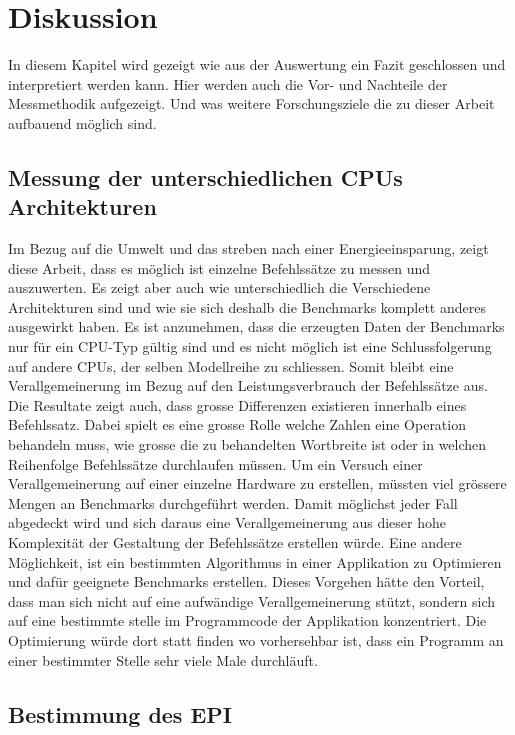 \chapter{Diskussion}

In diesem Kapitel wird gezeigt wie aus der Auswertung ein Fazit geschlossen und interpretiert werden kann. Hier werden auch die Vor- und Nachteile der Messmethodik aufgezeigt. Und was weitere Forschungsziele die zu dieser Arbeit aufbauend möglich sind.

\section{Messung der unterschiedlichen CPUs Architekturen}
Im Bezug auf die Umwelt und das streben nach einer Energieeinsparung, zeigt diese Arbeit, dass es möglich ist einzelne Befehlssätze zu messen und auszuwerten. Es zeigt aber auch wie unterschiedlich die Verschiedene Architekturen sind und wie sie sich deshalb die Benchmarks komplett anderes ausgewirkt haben. Es ist anzunehmen, dass die erzeugten Daten der Benchmarks nur für ein CPU-Typ gültig sind und es nicht möglich ist eine Schlussfolgerung auf andere CPUs, der selben Modellreihe zu schliessen. Somit bleibt eine Verallgemeinerung im Bezug auf den Leistungsverbrauch der Befehlssätze aus. Die Resultate zeigt auch, dass grosse Differenzen existieren innerhalb eines Befehlssatz. Dabei spielt es eine grosse Rolle welche Zahlen eine Operation behandeln muss, wie grosse die zu behandelten Wortbreite ist oder in welchen Reihenfolge Befehlssätze durchlaufen müssen. Um ein Versuch einer Verallgemeinerung auf einer einzelne Hardware zu erstellen, müssten viel grössere Mengen an Benchmarks durchgeführt werden. Damit möglichst jeder Fall abgedeckt wird und sich daraus eine Verallgemeinerung aus dieser hohe Komplexität der Gestaltung der Befehlssätze erstellen würde. Eine andere Möglichkeit, ist ein bestimmten Algorithmus in einer Applikation zu Optimieren und dafür geeignete Benchmarks erstellen. Dieses Vorgehen hätte den Vorteil, dass man sich nicht auf eine aufwändige Verallgemeinerung stützt, sondern sich auf eine bestimmte stelle im Programmcode der Applikation konzentriert. Die Optimierung würde dort statt finden wo vorhersehbar ist, dass ein Programm an einer bestimmter Stelle sehr viele Male durchläuft.

\section{Bestimmung des EPI}
\label{sec:bestimmung_grundenergie}


